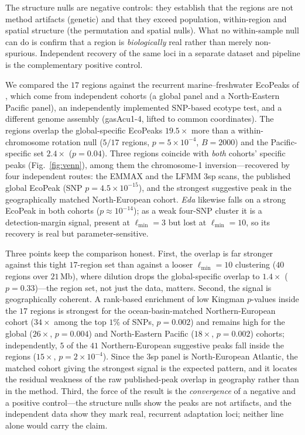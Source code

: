 \documentclass[11pt]{article}
\begin{document}
The structure nulls are negative controls: they establish that the regions are not
method artifacts (genetic) and that they exceed population, within-region and
spatial structure (the permutation and spatial nulls). What no within-sample null
can do is confirm that a region is \emph{biologically} real rather than merely
non-spurious. Independent recovery of the same loci in a separate dataset and
pipeline is the complementary positive control.

We compared the $17$ regions against the recurrent marine--freshwater EcoPeaks of
\citet{kingman2021predicting}, which come from independent cohorts (a global panel
and a North-Eastern Pacific panel), an independently implemented SNP-based ecotype
test, and a different genome assembly (gasAcu1-4, lifted to common coordinates).
The regions overlap the global-specific EcoPeaks $19.5\times$ more than a
within-chromosome rotation null ($5/17$ regions, $p = 5\times10^{-4}$, $B = 2000$)
and the Pacific-specific set $2.4\times$ ($p = 0.04$). Three regions coincide with
\emph{both} cohorts' specific peaks (Fig.~\ref{fig:venn}), among them the
chromosome-1 inversion---recovered by four independent routes: the EMMAX and the
LFMM 3sp scans, the published global EcoPeak (SNP $p = 4.5\times10^{-15}$), and the
strongest suggestive peak in the geographically matched North-European cohort.
\textit{Eda} likewise falls on a strong EcoPeak in both cohorts
($p \approx 10^{-14}$); as a weak four-SNP cluster it is a detection-margin signal,
present at $\ell_{\min} = 3$ but lost at $\ell_{\min} = 10$, so its recovery is real
but parameter-sensitive.

Three points keep the comparison honest. First, the overlap is far stronger against
this tight $17$-region set than against a looser $\ell_{\min} = 10$ clustering ($40$
regions over $21$\,Mb), where dilution drops the global-specific overlap to
$1.4\times$ ($p = 0.33$)---the region set, not just the data, matters. Second, the
signal is geographically coherent. A rank-based enrichment of low Kingman
$p$-values inside the $17$ regions is strongest for the ocean-basin-matched
Northern-European cohort ($34\times$ among the top $1\%$ of SNPs, $p = 0.002$) and
remains high for the global ($26\times$, $p = 0.004$) and North-Eastern Pacific
($18\times$, $p = 0.002$) cohorts; independently, $5$ of the $41$ Northern-European
suggestive peaks fall inside the regions ($15\times$, $p = 2\times10^{-4}$). Since
the 3sp panel is North-European Atlantic, the matched cohort giving the strongest
signal is the expected pattern, and it locates the residual weakness of the raw
published-peak overlap in geography rather than in the method. Third, the force of
the result is the \emph{convergence} of a negative and a positive control---the
structure nulls show the peaks are not artifacts, and the independent data show they
mark real, recurrent adaptation loci; neither line alone would carry the claim.
\end{document}
